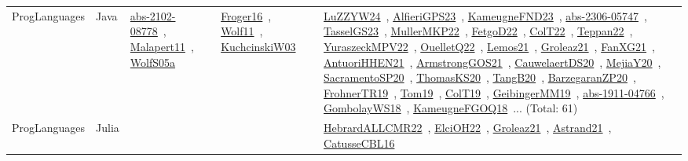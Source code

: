 {\begin{longtable}{lp{3cm}>{\raggedright\arraybackslash}p{6cm}>{\raggedright\arraybackslash}p{6cm}>{\raggedright\arraybackslash}p{8cm}}
ProgLanguages & Java & \href{../works/abs-2102-08778.pdf}{abs-2102-08778}~\cite{abs-2102-08778}, \href{../works/Malapert11.pdf}{Malapert11}~\cite{Malapert11}, \href{../works/WolfS05a.pdf}{WolfS05a}~\cite{WolfS05a} & \href{../works/Froger16.pdf}{Froger16}~\cite{Froger16}, \href{../works/Wolf11.pdf}{Wolf11}~\cite{Wolf11}, \href{../works/KuchcinskiW03.pdf}{KuchcinskiW03}~\cite{KuchcinskiW03} & \href{../works/LuZZYW24.pdf}{LuZZYW24}~\cite{LuZZYW24}, \href{../works/AlfieriGPS23.pdf}{AlfieriGPS23}~\cite{AlfieriGPS23}, \href{../works/KameugneFND23.pdf}{KameugneFND23}~\cite{KameugneFND23}, \href{../works/abs-2306-05747.pdf}{abs-2306-05747}~\cite{abs-2306-05747}, \href{../works/TasselGS23.pdf}{TasselGS23}~\cite{TasselGS23}, \href{../works/MullerMKP22.pdf}{MullerMKP22}~\cite{MullerMKP22}, \href{../works/FetgoD22.pdf}{FetgoD22}~\cite{FetgoD22}, \href{../works/ColT22.pdf}{ColT22}~\cite{ColT22}, \href{../works/Teppan22.pdf}{Teppan22}~\cite{Teppan22}, \href{../works/YuraszeckMPV22.pdf}{YuraszeckMPV22}~\cite{YuraszeckMPV22}, \href{../works/OuelletQ22.pdf}{OuelletQ22}~\cite{OuelletQ22}, \href{../works/Lemos21.pdf}{Lemos21}~\cite{Lemos21}, \href{../works/Groleaz21.pdf}{Groleaz21}~\cite{Groleaz21}, \href{../works/FanXG21.pdf}{FanXG21}~\cite{FanXG21}, \href{../works/AntuoriHHEN21.pdf}{AntuoriHHEN21}~\cite{AntuoriHHEN21}, \href{../works/ArmstrongGOS21.pdf}{ArmstrongGOS21}~\cite{ArmstrongGOS21}, \href{../works/CauwelaertDS20.pdf}{CauwelaertDS20}~\cite{CauwelaertDS20}, \href{../works/MejiaY20.pdf}{MejiaY20}~\cite{MejiaY20}, \href{../works/SacramentoSP20.pdf}{SacramentoSP20}~\cite{SacramentoSP20}, \href{../works/ThomasKS20.pdf}{ThomasKS20}~\cite{ThomasKS20}, \href{../works/TangB20.pdf}{TangB20}~\cite{TangB20}, \href{../works/BarzegaranZP20.pdf}{BarzegaranZP20}~\cite{BarzegaranZP20}, \href{../works/FrohnerTR19.pdf}{FrohnerTR19}~\cite{FrohnerTR19}, \href{../works/Tom19.pdf}{Tom19}~\cite{Tom19}, \href{../works/ColT19.pdf}{ColT19}~\cite{ColT19}, \href{../works/GeibingerMM19.pdf}{GeibingerMM19}~\cite{GeibingerMM19}, \href{../works/abs-1911-04766.pdf}{abs-1911-04766}~\cite{abs-1911-04766}, \href{../works/GombolayWS18.pdf}{GombolayWS18}~\cite{GombolayWS18}, \href{../works/KameugneFGOQ18.pdf}{KameugneFGOQ18}~\cite{KameugneFGOQ18}... (Total: 61)\\
ProgLanguages & Julia &  &  & \href{../works/HebrardALLCMR22.pdf}{HebrardALLCMR22}~\cite{HebrardALLCMR22}, \href{../works/ElciOH22.pdf}{ElciOH22}~\cite{ElciOH22}, \href{../works/Groleaz21.pdf}{Groleaz21}~\cite{Groleaz21}, \href{../works/Astrand21.pdf}{Astrand21}~\cite{Astrand21}, \href{../works/CatusseCBL16.pdf}{CatusseCBL16}~\cite{CatusseCBL16}\\

\end{longtable}}
